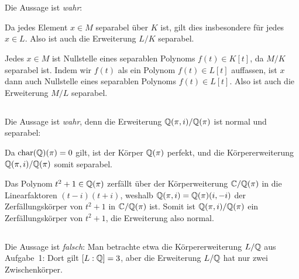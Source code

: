 \section{}





\subsection{}

Die Aussage ist \emph{wahr}:

Da jedes Element $x \in M$ separabel über $K$ ist, gilt dies insbesondere für jedes $x \in L$.
Also ist auch die Erweiterung $L/K$ separabel.

Jedes $x \in M$ ist Nullstelle eines separablen Polynoms $f(t) \in K[t]$, da $M/K$ separabel ist.
Indem wir $f(t)$ als ein Polynom $f(t) \in L[t]$ auffassen, ist $x$ dann auch Nullstelle eines separablen Polynoms $f(t) \in L[t]$.
Also ist auch die Erweiterung $M/L$ separabel.





\subsection{}

Die Aussage ist \emph{wahr}, denn die Erweiterung $\mathbb{Q}(\pi,i)/\mathbb{Q}(\pi)$ ist normal und separabel:

Da $\operatorname{char}(\mathbb{Q})(\pi) = 0$ gilt, ist der Körper $\mathbb{Q}(\pi)$ perfekt, und die Körpererweiterung $\mathbb{Q}(\pi,i)/\mathbb{Q}(\pi)$ somit separabel.

Das Polynom $t^2 + 1 \in \mathbb{Q}(\pi)$ zerfällt über der Körperweiterung $\mathbb{C}/\mathbb{Q}(\pi)$ in die Linearfaktoren $(t-i)(t+i)$, weshalb $\mathbb{Q}(\pi,i) = \mathbb{Q}(\pi)(i,-i)$ der Zerfällungskörper von $t^2 + 1$ in $\mathbb{C}/\mathbb{Q}(\pi)$ ist.
Somit ist $\mathbb{Q}(\pi,i)/\mathbb{Q}(\pi)$ ein Zerfällungskörper von $t^2 + 1$, die Erweiterung also normal.





\subsection{}

Die Aussage ist \emph{falsch}:
Man betrachte etwa die Körpererweiterung $L/\mathbb{Q}$ aus Aufgabe~1:
Dort gilt $[L : \mathbb{Q}] = 3$, aber die Erweiterung $L/\mathbb{Q}$ hat nur zwei Zwischenkörper.





